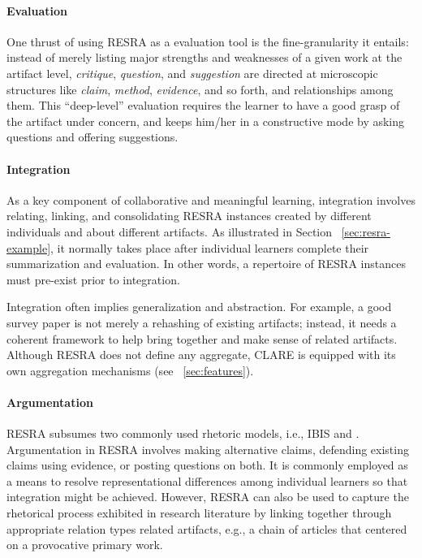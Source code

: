 \paragraph{Evaluation}

One thrust of using RESRA as a evaluation tool is the fine-granularity
it entails: instead of merely listing major strengths and weaknesses of a
given work at the artifact level, {\it critique\/}, {\it question\/}, and
{\it suggestion\/} are directed at microscopic structures like {\it
claim\/}, {\it method\/}, {\it evidence\/}, and so forth, and relationships
among them. This ``deep-level'' evaluation requires the learner to have a
good grasp of the artifact under concern, and keeps him/her in a constructive
mode by asking questions and offering suggestions.

\paragraph{Integration}

As a key component of collaborative and meaningful learning, integration
involves relating, linking, and consolidating RESRA instances created by
different individuals and about different artifacts. As illustrated in
Section ~\ref{sec:resra-example}, it normally takes place after individual
learners complete their summarization and evaluation. In other
words, a repertoire of RESRA instances must pre-exist prior to integration.

Integration often implies generalization and abstraction. For example, a
good survey paper is not merely a rehashing of existing artifacts; instead,
it needs a coherent framework to help bring together and make sense of
related artifacts. Although RESRA does not define any aggregate, CLARE is
equipped with its own aggregation mechanisms (see ~\ref{sec:features}).

\paragraph{Argumentation}

RESRA subsumes two commonly used rhetoric models, i.e., IBIS
\cite{Conklin88Gibis} and \cite{Toulmin84}. Argumentation in RESRA involves
making alternative claims, defending existing claims using evidence, or
posting questions on both. It is commonly employed as a means to resolve
representational differences among individual learners so that integration
might be achieved. However, RESRA can also be used to capture the
rhetorical process exhibited in research literature by linking together
through appropriate relation types related artifacts, e.g., a chain of
articles that centered on a provocative primary work.

